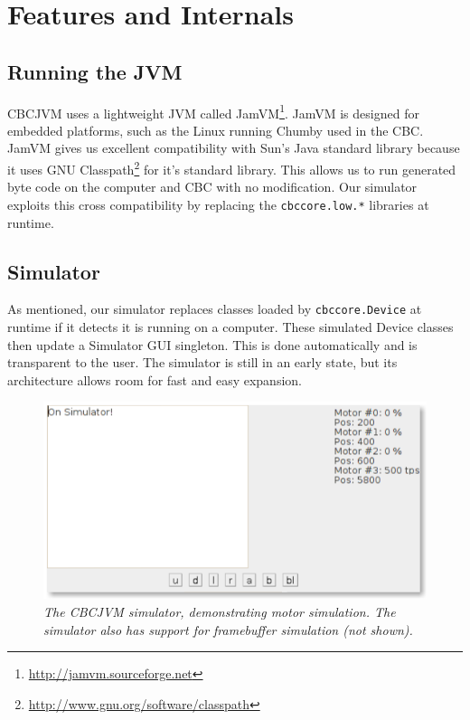 \documentclass[12pt,letterpaper]{article}
\newcommand{\urlfootnote}[1]{\footnote{\url{#1}}}
\begin{document}
\pagebreak
\section{Features and Internals}

\subsection{Running the JVM}

CBCJVM uses a lightweight JVM called JamVM\urlfootnote{http://jamvm.sourceforge.net}. JamVM is designed for embedded platforms, such as the Linux running Chumby used in the CBC. JamVM gives us excellent compatibility with Sun's Java standard library because it uses GNU Classpath\urlfootnote{http://www.gnu.org/software/classpath} for it's standard library. This allows us to run generated byte code on the computer and CBC with no modification. Our simulator exploits this cross compatibility by replacing the \texttt{cbccore.low.*} libraries at runtime.



\subsection{Simulator}

As mentioned, our simulator replaces classes loaded by \texttt{cbccore.Device} at runtime if it detects it is running on a computer. These simulated Device classes then update a Simulator GUI singleton. This is done automatically and is transparent to the user. The simulator is still in an early state, but its architecture allows room for fast and easy expansion.

\begin{figure}[h]
\begin{flushright}
\includegraphics[width=.75\textwidth]{simulator.png}
\end{flushright}
\caption{\textit{The CBCJVM simulator, demonstrating motor simulation. The simulator also has support for framebuffer simulation (not shown).}}
\end{figure}
\end{document}
